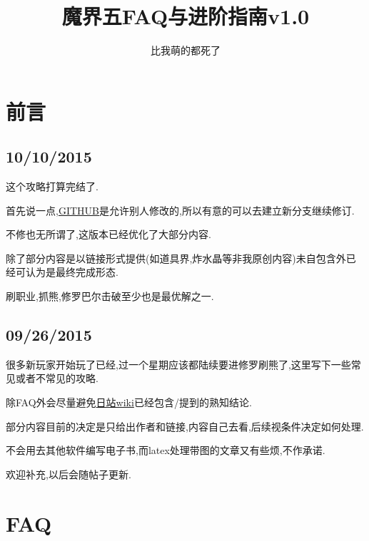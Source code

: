 




\title{魔界五FAQ与进阶指南v1.0}
\author{比我萌的都死了}
\maketitle


\section{前言}

\subsection{10/10/2015}


这个攻略打算完结了.

首先说一点,\href{https://github.com/KindleIsNotKind/Disgaea_5_How_To}{GITHUB}是允许别人修改的,所以有意的可以去建立新分支继续修订.

不修也无所谓了,这版本已经优化了大部分内容.

除了部分内容是以链接形式提供(如道具界,炸水晶等非我原创内容)未自包含外已经可认为是最终完成形态.

刷职业,抓熊,修罗巴尔击破至少也是最优解之一.

\subsection{09/26/2015}

很多新玩家开始玩了已经,过一个星期应该都陆续要进修罗刷熊了,这里写下一些常见或者不常见的攻略.

{\color{red}{本文建立在有魔女DLC和暴君DLC的基础之上,几十块钱和几十小时时间自己选.}}

除FAQ外会尽量避免\href{http://wikinavi.net/disgaea5/index.php}{日站wiki}已经包含/提到的熟知结论.

部分内容目前的决定是只给出作者和链接,内容自己去看,后续视条件决定如何处理.

不会用去其他软件编写电子书,而latex处理带图的文章又有些烦,不作承诺.

欢迎补充,以后会随帖子更新.


\newpage
\tableofcontents

\newpage

\section{FAQ}

